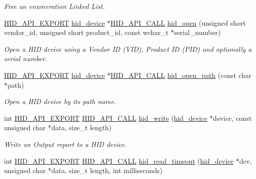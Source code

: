 \begin{DoxyCompactItemize}
\begin{DoxyCompactList}\small\item\em \-Free an enumeration \-Linked \-List. \end{DoxyCompactList}\item 
\hyperlink{hidapi_8h_aa60150016800ccb88fdf140e8553ae13}{\-H\-I\-D\-\_\-\-A\-P\-I\-\_\-\-E\-X\-P\-O\-R\-T} \hyperlink{hidapi_8h_aa6da74d5686d198dd3e5440e60088fcc}{hid\-\_\-device} \*
$\ast$\hyperlink{hidapi_8h_af140a25716604e86096670a505a58ee0}{\-H\-I\-D\-\_\-\-A\-P\-I\-\_\-\-C\-A\-L\-L} \hyperlink{group___a_p_i_gae6910ed9f01c4a99d25539b16800e90c}{hid\-\_\-open} (unsigned short vendor\-\_\-id, unsigned short product\-\_\-id, const wchar\-\_\-t $\ast$serial\-\_\-number)
\begin{DoxyCompactList}\small\item\em \-Open a \-H\-I\-D device using a \-Vendor \-I\-D (\-V\-I\-D), \-Product \-I\-D (\-P\-I\-D) and optionally a serial number. \end{DoxyCompactList}\item 
\hyperlink{hidapi_8h_aa60150016800ccb88fdf140e8553ae13}{\-H\-I\-D\-\_\-\-A\-P\-I\-\_\-\-E\-X\-P\-O\-R\-T} \hyperlink{hidapi_8h_aa6da74d5686d198dd3e5440e60088fcc}{hid\-\_\-device} \*
$\ast$\hyperlink{hidapi_8h_af140a25716604e86096670a505a58ee0}{\-H\-I\-D\-\_\-\-A\-P\-I\-\_\-\-C\-A\-L\-L} \hyperlink{group___a_p_i_ga1e87518670f88540c920dc451df608ee}{hid\-\_\-open\-\_\-path} (const char $\ast$path)
\begin{DoxyCompactList}\small\item\em \-Open a \-H\-I\-D device by its path name. \end{DoxyCompactList}\item 
int \hyperlink{hidapi_8h_aa60150016800ccb88fdf140e8553ae13}{\-H\-I\-D\-\_\-\-A\-P\-I\-\_\-\-E\-X\-P\-O\-R\-T} \hyperlink{hidapi_8h_af140a25716604e86096670a505a58ee0}{\-H\-I\-D\-\_\-\-A\-P\-I\-\_\-\-C\-A\-L\-L} \hyperlink{group___a_p_i_gad14ea48e440cf5066df87cc6488493af}{hid\-\_\-write} (\hyperlink{hidapi_8h_aa6da74d5686d198dd3e5440e60088fcc}{hid\-\_\-device} $\ast$device, const unsigned char $\ast$data, size\-\_\-t length)
\begin{DoxyCompactList}\small\item\em \-Write an \-Output report to a \-H\-I\-D device. \end{DoxyCompactList}\item 
int \hyperlink{hidapi_8h_aa60150016800ccb88fdf140e8553ae13}{\-H\-I\-D\-\_\-\-A\-P\-I\-\_\-\-E\-X\-P\-O\-R\-T} \hyperlink{hidapi_8h_af140a25716604e86096670a505a58ee0}{\-H\-I\-D\-\_\-\-A\-P\-I\-\_\-\-C\-A\-L\-L} \hyperlink{group___a_p_i_gaa5c9ed5aa290688ffac03343989ad75a}{hid\-\_\-read\-\_\-timeout} (\hyperlink{hidapi_8h_aa6da74d5686d198dd3e5440e60088fcc}{hid\-\_\-device} $\ast$dev, unsigned char $\ast$data, size\-\_\-t length, int milliseconds)

\end{DoxyCompactItemize}

